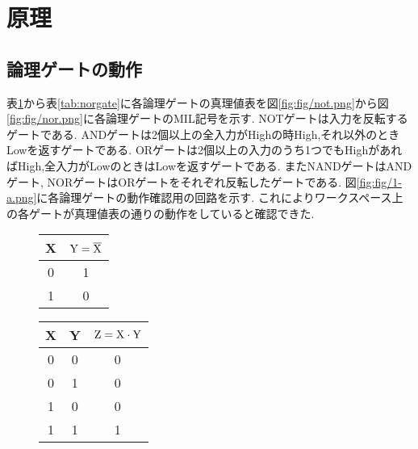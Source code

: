 \section{原理}
\subsection{論理ゲートの動作}
表\ref{tab:notgate}から表\ref{tab:norgate}に各論理ゲートの真理値表を図\ref{fig:fig/not.png}から図\ref{fig:fig/nor.png}に各論理ゲートのMIL記号を示す.
NOTゲートは入力を反転するゲートである.
ANDゲートは2個以上の全入力がHighの時High,それ以外のときLowを返すゲートである.
ORゲートは2個以上の入力のうち1つでもHighがあればHigh,全入力がLowのときはLowを返すゲートである.
またNANDゲートはANDゲート,
NORゲートはORゲートをそれぞれ反転したゲートである.
図\ref{fig:fig/1-a.png}に各論理ゲートの動作確認用の回路を示す.
これによりワークスペース上の各ゲートが真理値表の通りの動作をしていると確認できた.
\begin{figure}[h]
  \def\@captype{table}
  \begin{minipage}[t]{.48\textwidth}
    \begin{center}
      \begin{tabular}{cc}
        \hline
        X & $\rm Y=\overline{X}$\\
        \hline
        0 & 1\\
        1 & 0\\
        \hline
      \end{tabular}
    \end{center}
    \label{tab:notgate}
  \end{minipage}
  \hfill
  \begin{minipage}[c]{.48\textwidth}
  \end{minipage}
\end{figure}
\begin{figure}[h]
  \def\@captype{table}
  \begin{minipage}[t]{.48\textwidth}
    \begin{center}
      \begin{tabular}{ccc}
        \hline
        X & Y & $\rm Z=X\cdot Y$\\
        \hline
        0 & 0 & 0\\
        0 & 1 & 0\\
        1 & 0 & 0\\
        1 & 1 & 1\\
        \hline
      \end{tabular}
    \end{center}
    \label{tab:andgate}
  \end{minipage}
  \hfill
  \begin{minipage}[c]{.48\textwidth}
  \end{minipage}
\end{figure}
